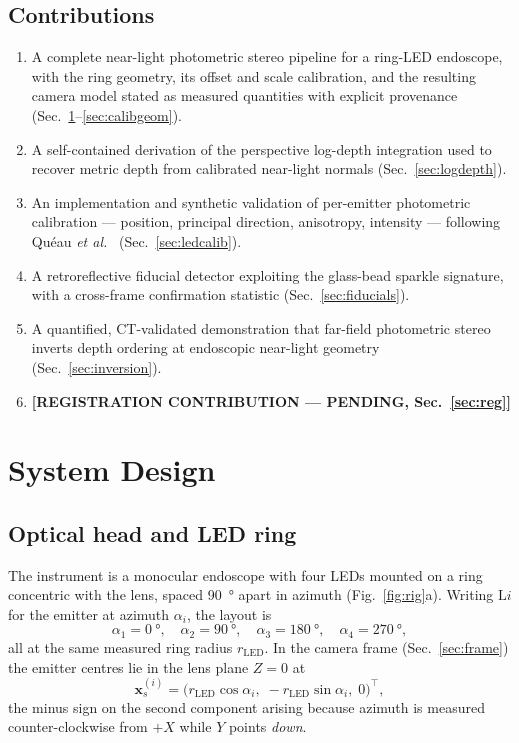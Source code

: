 \documentclass[journal,10pt]{IEEEtran}
\newcommand{\TODO}[1]{\textcolor{todoRed}{\textbf{[#1]}}}
\newcommand{\vecx}{\bm{x}}
\begin{document}
\subsection{Contributions}
\begin{enumerate}
\item A complete near-light photometric stereo pipeline for a ring-LED
endoscope, with the ring geometry, its offset and scale calibration, and the
resulting camera model stated as measured quantities with explicit provenance
(Sec.~\ref{sec:system}--\ref{sec:calibgeom}).
\item A self-contained derivation of the perspective log-depth integration used
to recover metric depth from calibrated near-light normals
(Sec.~\ref{sec:logdepth}).
\item An implementation and synthetic validation of per-emitter photometric
calibration --- position, principal direction, anisotropy, intensity ---
following Qu\'eau \textit{et al.}~\cite{queau2018led} (Sec.~\ref{sec:ledcalib}).
\item A retroreflective fiducial detector exploiting the glass-bead sparkle
signature, with a cross-frame confirmation statistic
(Sec.~\ref{sec:fiducials}).
\item A quantified, CT-validated demonstration that far-field photometric stereo
inverts depth ordering at endoscopic near-light geometry
(Sec.~\ref{sec:inversion}).
\item \TODO{REGISTRATION CONTRIBUTION --- PENDING, Sec.~\ref{sec:reg}}
\end{enumerate}

\section{System Design}\label{sec:system}

\subsection{Optical head and LED ring}
The instrument is a monocular endoscope with four LEDs mounted on a ring
concentric with the lens, spaced \SI{90}{\degree} apart in azimuth
(Fig.~\ref{fig:rig}a). Writing $\mathrm{L}i$ for the emitter at azimuth
$\alpha_i$, the layout is
\begin{equation}
\alpha_1 = \SI{0}{\degree},\quad
\alpha_2 = \SI{90}{\degree},\quad
\alpha_3 = \SI{180}{\degree},\quad
\alpha_4 = \SI{270}{\degree},
\end{equation}
all at the same measured ring radius $r_\mathrm{LED}$. In the camera frame
(Sec.~\ref{sec:frame}) the emitter centres lie in the lens plane $Z=0$ at
\begin{equation}
\vecx_s^{(i)} = \bigl(r_\mathrm{LED}\cos\alpha_i,\;
-r_\mathrm{LED}\sin\alpha_i,\; 0\bigr)^{\!\top},
\label{eq:ledpos}
\end{equation}
the minus sign on the second component arising because azimuth is measured
counter-clockwise from $+X$ while $Y$ points \emph{down}.
\end{document}
